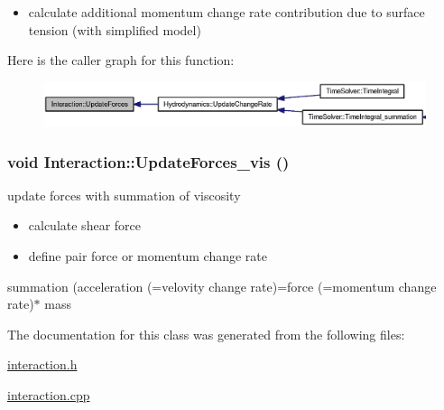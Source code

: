 \begin{itemize}
\item calculate additional momentum change rate contribution due to surface tension (with simplified model) \end{itemize}


Here is the caller graph for this function:\nopagebreak
\begin{figure}[H]
\begin{center}
\leavevmode
\includegraphics[width=334pt]{classInteraction_7d1b68aea03829678cfbe8c5ec3acc2a_icgraph}
\end{center}
\end{figure}
\hypertarget{classInteraction_4cfd21ed44349e4295fd70e98bdae381}{
\subsubsection[{UpdateForces\_\-vis}]{\setlength{\rightskip}{0pt plus 5cm}void Interaction::UpdateForces\_\-vis ()}}
\label{classInteraction_4cfd21ed44349e4295fd70e98bdae381}


update forces with summation of viscosity 



\begin{itemize}
\item calculate shear force\end{itemize}


\begin{itemize}
\item define pair force or momentum change rate\end{itemize}


summation (acceleration (=velovity change rate)=force (=momentum change rate)$\ast$ mass 

The documentation for this class was generated from the following files:\begin{CompactItemize}
\item 
\hyperlink{interaction_8h}{interaction.h}\item 
\hyperlink{interaction_8cpp}{interaction.cpp}\end{CompactItemize}
